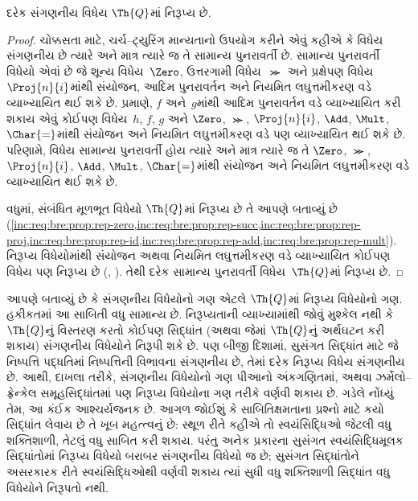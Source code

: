 \begin{thm}
દરેક સંગણનીય વિધેય
$\Th{Q}$માં નિરૂપ્ય છે.
\end{thm}

\begin{proof}
ચોક્કસતા માટે, ચર્ચ--ટ્યુરિંગ
માન્યતાનો ઉપયોગ કરીને એવું
કહીએ કે વિધેય સંગણનીય છે
ત્યારે અને માત્ર ત્યારે જ
તે સામાન્ય પુનરાવર્તી છે.
સામાન્ય પુનરાવર્તી વિધેયો
એવાં છે જે શૂન્ય વિધેય~$\Zero$,
ઉત્તરગામી વિધેય~$\Succ$ અને
પ્રક્ષેપણ વિધેય~$\Proj{n}{i}$માંથી
સંયોજન, આદિમ પુનરાવર્તન અને
નિયમિત લઘુત્તમીકરણ વડે
વ્યાખ્યાયિત થઈ શકે છે.
 પ્રમાણે,
$f$ અને~$g$માંથી આદિમ પુનરાવર્તન વડે વ્યાખ્યાયિત
કરી શકાય એવું કોઈપણ વિધેય~$h$,
$f$, $g$ અને $\Zero$,
$\Succ$, $\Proj{n}{i}$,
$\Add$, $\Mult$, $\Char{=}$માંથી
સંયોજન અને નિયમિત લઘુત્તમીકરણ
વડે પણ વ્યાખ્યાયિત થઈ શકે છે.
પરિણામે, વિધેય સામાન્ય પુનરાવર્તી
હોય ત્યારે અને માત્ર ત્યારે જ
તે $\Zero$, $\Succ$,
$\Proj{n}{i}$, $\Add$,
$\Mult$, $\Char{=}$માંથી
સંયોજન અને નિયમિત લઘુત્તમીકરણ
વડે વ્યાખ્યાયિત થઈ શકે છે.

વધુમાં, સંબંધિત મૂળભૂત વિધેયો
$\Th{Q}$માં નિરૂપ્ય છે તે આપણે
બતાવ્યું છે
(\cref{inc:req:bre:prop:rep-zero,inc:req:bre:prop:rep-succ,inc:req:bre:prop:rep-proj,inc:req:bre:prop:rep-id,inc:req:bre:prop:rep-add,inc:req:bre:prop:rep-mult}).
નિરૂપ્ય વિધેયોમાંથી સંયોજન
અથવા નિયમિત લઘુત્તમીકરણ
વડે વ્યાખ્યાયિત કોઈપણ વિધેય
પણ નિરૂપ્ય છે
(,
).
તેથી દરેક સામાન્ય પુનરાવર્તી
વિધેય~$\Th{Q}$માં નિરૂપ્ય છે.
\end{proof}

\begin{explain}
આપણે બતાવ્યું છે કે સંગણનીય
વિધેયોનો ગણ એટલે $\Th{Q}$માં
નિરૂપ્ય વિધેયોનો ગણ.
હકીકતમાં આ સાબિતી વધુ સામાન્ય
છે. નિરૂપ્યતાની વ્યાખ્યામાંથી
જોવું મુશ્કેલ નથી કે
$\Th{Q}$નું વિસ્તરણ કરતો
કોઈપણ સિદ્ધાંત (અથવા જેમાં
$\Th{Q}$નું અર્થઘટન કરી શકાય)
સંગણનીય વિધેયોને નિરૂપી શકે છે.
પણ બીજી દિશામાં, સુસંગત સિદ્ધાંત માટે જે
નિષ્પત્તિ પદ્ધતિમાં
નિષ્પત્તિની વિભાવના સંગણનીય
છે, તેમાં દરેક નિરૂપ્ય વિધેય
સંગણનીય છે. આથી, દાખલા તરીકે,
સંગણનીય વિધેયોનો ગણ પીઆનો
અંકગણિતમાં, અથવા ઝર્મેલો--ફ્રેન્કેલ
સમૂહસિદ્ધાંતમાં પણ નિરૂપ્ય
વિધેયોના ગણ તરીકે વર્ણવી શકાય
છે. ગડેલે નોંધ્યું તેમ, આ કંઈક
આશ્ચર્યજનક છે. આગળ જોઈશું
કે સાબિતિક્ષમતાના પ્રશ્નો માટે
કયો સિદ્ધાંત લેવાય છે તે ખૂબ
મહત્ત્વનું છે: સ્થૂળ રીતે કહીએ
તો સ્વયંસિદ્ધિઓ જેટલી વધુ
શક્તિશાળી, તેટલું વધુ સાબિત
કરી શકાય. પરંતુ અનેક પ્રકારના સુસંગત
સ્વયંસિદ્ધિમૂલક સિદ્ધાંતોમાં
નિરૂપ્ય વિધેયો બરાબર સંગણનીય
વિધેયો જ છે; સુસંગત સિદ્ધાંતોને
અસરકારક રીતે સ્વયંસિદ્ધિઓથી વર્ણવી શકાય
ત્યાં સુધી વધુ શક્તિશાળી
સિદ્ધાંત વધુ વિધેયોને નિરૂપતો
નથી.
\end{explain}
\endgroup


